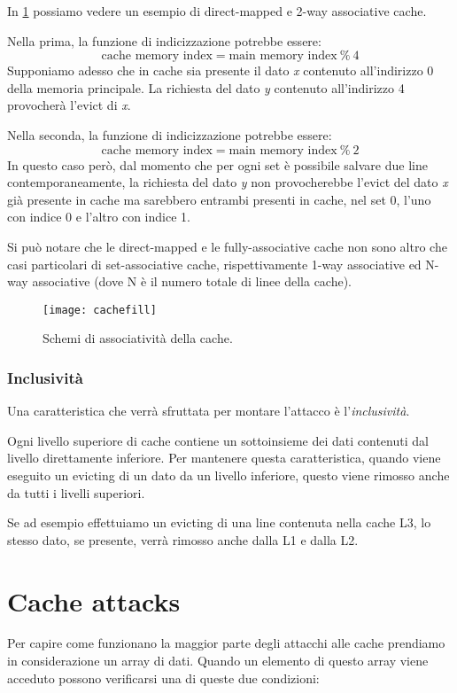 				In \cref{fig:cachefill} possiamo vedere un esempio di direct-mapped e 2-way associative cache. 
				
				Nella prima, la funzione di indicizzazione potrebbe essere: $$\text{cache memory index} = \text{main memory index}\ \% \ 4$$ Supponiamo adesso che in cache sia presente il dato \emph{x} contenuto all'indirizzo $0$ della memoria principale. La richiesta del dato \emph{y} contenuto all'indirizzo 4 provocherà l'evict di \emph{x}.
				
				Nella seconda, la funzione di indicizzazione potrebbe essere: $$\text{cache memory index} = \text{main memory index}\ \% \ 2$$ In questo caso però, dal momento che per ogni set è possibile salvare due line contemporaneamente, la richiesta del dato \emph{y} non provocherebbe l'evict del dato \emph{x} già presente in cache ma sarebbero entrambi presenti in cache, nel set $0$, l'uno con indice $0$ e l'altro con indice 1.
				
				Si può notare che le direct-mapped e le fully-associative cache non sono altro che casi particolari di set-associative cache, rispettivamente 1-way associative ed N-way associative (dove N è il numero totale di linee della cache).
				
				\begin{figure}
					\begin{center}
						\texttt{[image: cachefill]}
						\caption{Schemi di associatività della cache.}
						\label{fig:cachefill}
					\end{center}
				\end{figure}
				
			\subsubsection{Inclusività}
				Una caratteristica che verrà sfruttata per montare l'attacco è l'\emph{inclusività}. 
				
				Ogni livello superiore di cache contiene un sottoinsieme dei dati contenuti dal livello direttamente inferiore. Per mantenere questa caratteristica, quando viene eseguito un evicting di un dato da un livello inferiore, questo viene rimosso anche da tutti i livelli superiori.
				
				Se ad esempio effettuiamo un evicting di una line contenuta nella cache L3, lo stesso dato, se presente, verrà rimosso anche dalla L1 e dalla L2.
				
	\section{Cache attacks}
		Per capire come funzionano la maggior parte degli attacchi alle cache prendiamo in considerazione un array di dati. Quando un elemento di questo array viene acceduto possono verificarsi una di queste due condizioni:
		
